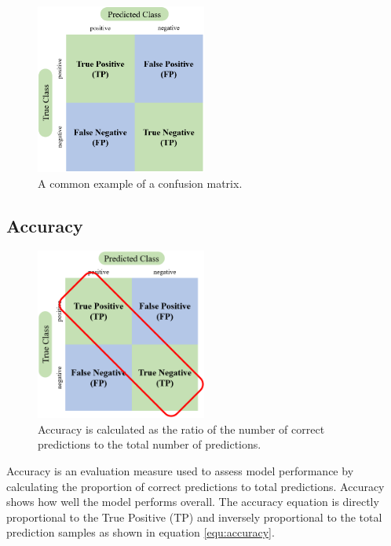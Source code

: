 \begin{figure}[h!]
    \centering
    \includegraphics[width=0.5\textwidth]{bab2/ar_confmatrix.png}
    \caption{A common example of a confusion matrix.}
    \label{fig: convmatrix}
\end{figure}

\subsection{Accuracy}
\label{subsec3: accuracy}

\begin{figure}[h!]
    \centering
    \includegraphics[width=0.5\textwidth]{bab2/ar_Accuracy.png}
    \caption{Accuracy is calculated as the ratio of the number of correct predictions to the total number of predictions.}
    \label{fig:MetricAccuracy}
\end{figure}

Accuracy is an evaluation measure used to assess model performance by calculating the proportion of correct predictions to total predictions. Accuracy shows how well the model performs overall. The accuracy equation is directly proportional to the True Positive (TP) and inversely proportional to the total prediction samples as shown in equation \ref{equ:accuracy}.

